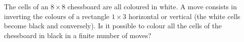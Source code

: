 The cells of an $8\times 8$ chessboard are all coloured in white.
A move consists in inverting the colours of a rectangle $1\times 3$ horizontal or vertical
(the white cells become black and conversely).
Is it possible to colour all the cells of the chessboard in black in a finite number of moves?
